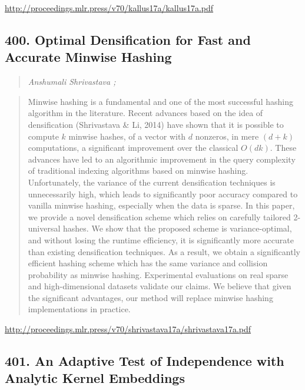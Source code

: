 \documentclass{article}
\begin{document}
\href{http://proceedings.mlr.press/v70/kallus17a/kallus17a.pdf}{http://proceedings.mlr.press/v70/kallus17a/kallus17a.pdf}

\subsection{400. Optimal Densification for Fast and Accurate Minwise Hashing}

\begin{quote}
\footnotesize{\textit{Anshumali Shrivastava ;}}

\end{quote}

\begin{quote}
    Minwise hashing is a fundamental and one of the most successful hashing algorithm in the literature. Recent advances based on the idea of densification (Shrivastava \& Li, 2014) have shown that it is possible to compute $k$ minwise hashes, of a vector with $d$ nonzeros, in mere $(d + k)$ computations, a significant improvement over the classical $O(dk)$. These advances have led to an algorithmic improvement in the query complexity of traditional indexing algorithms based on minwise hashing. Unfortunately, the variance of the current densification techniques is unnecessarily high, which leads to significantly poor accuracy compared to vanilla minwise hashing, especially when the data is sparse. In this paper, we provide a novel densification scheme which relies on carefully tailored 2-universal hashes. We show that the proposed scheme is variance-optimal, and without losing the runtime efficiency, it is significantly more accurate than existing densification techniques. As a result, we obtain a significantly efficient hashing scheme which has the same variance and collision probability as minwise hashing. Experimental evaluations on real sparse and high-dimensional datasets validate our claims. We believe that given the significant advantages, our method will replace minwise hashing implementations in practice.  
\end{quote}

\href{http://proceedings.mlr.press/v70/shrivastava17a/shrivastava17a.pdf}{http://proceedings.mlr.press/v70/shrivastava17a/shrivastava17a.pdf}

\subsection{401. An Adaptive Test of Independence with Analytic Kernel Embeddings}
\end{document}
